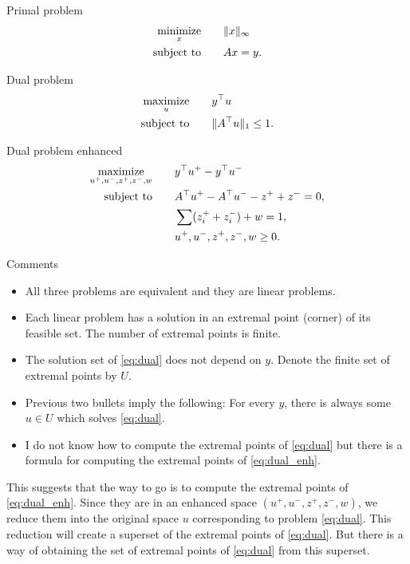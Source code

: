 \documentclass{article}
\newcommand{\mnmz}{\operatorname*{minimize}}
\newcommand{\mxmz}{\operatorname*{maximize}}
\newcommand{\st}{\operatorname{subject\ to}}
\newcommand{\norm}[1]{\|#1\|}
\theoremstyle{definition}
\begin{document}
Primal problem
\begin{equation}\label{eq:primal}
  \aligned
  \mnmz_x\qquad &\norm{x}_\infty \\
  \st\qquad &Ax=y.
  \endaligned
\end{equation}

Dual problem
\begin{equation}\label{eq:dual}
  \aligned
  \mxmz_u\qquad &y^\top u \\
  \st\qquad &\norm{A^\top u}_1 \le 1.
  \endaligned
\end{equation}

Dual problem enhanced
\begin{equation}\label{eq:dual_enh}
  \aligned
  \mxmz_{u^+,u^-,z^+,z^-,w}\qquad &y^\top u^+ - y^\top u^-  \\
  \st\qquad &A^\top u^+ - A^\top u^- - z^+ + z^- = 0, \\
  &\sum(z_i^+ + z_i^-) + w = 1, \\
  &u^+,u^-,z^+,z^-,w \ge0.
  \endaligned
\end{equation}

Comments
\begin{itemize}\itemsep 0pt
 \item All three problems are equivalent and they are linear problems.
 \item Each linear problem has a solution in an extremal point (corner) of its feasible set. The number of extremal points is finite.
 \item The solution set of \eqref{eq:dual} does not depend on $y$. Denote the finite set of extremal points by $U$.
 \item Previous two bullets imply the following: For every $y$, there is always some $u\in U$ which solves \eqref{eq:dual}.
 \item I do not know how to compute the extremal points of \eqref{eq:dual} but there is a formula for computing the extremal points of \eqref{eq:dual_enh}.
\end{itemize}

This suggests that the way to go is to compute the extremal points of \eqref{eq:dual_enh}. Since they are in an enhanced space $(u^+,u^-,z^+,z^-,w)$, we reduce them into the original space $u$ corresponding to problem \eqref{eq:dual}. This reduction will create a superset of the extremal points of \eqref{eq:dual}. But there is a way of obtaining the set of extremal points of \eqref{eq:dual} from this superset.
\end{document}
